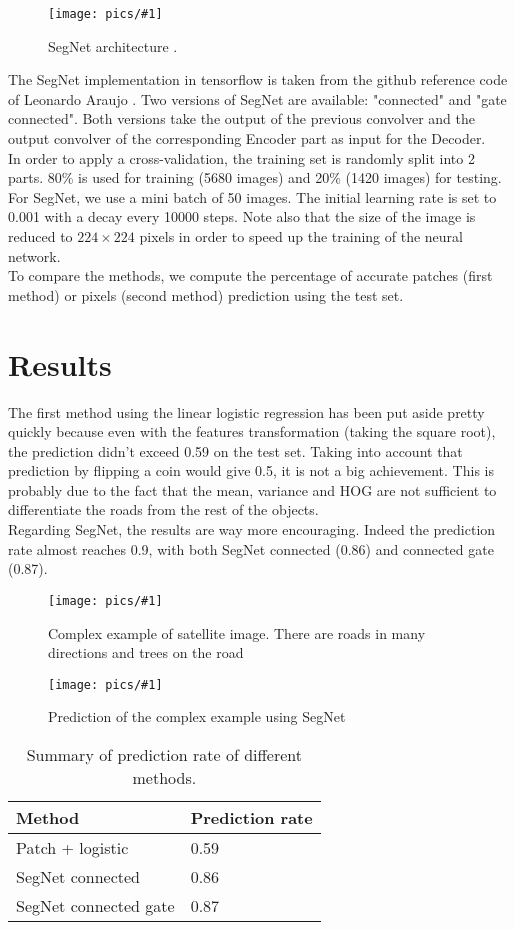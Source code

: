 \documentclass[10pt,conference,compsocconf]{IEEEtran}
\newcommand{\scalefig}[4]{
  \begin{figure}[ht!]
    \centering
    \texttt{[image: pics/\#1]}
 \caption{#3}
    \label{#4}
  \end{figure}}
\begin{document}
\scalefig{segnet}{1}{SegNet architecture \cite{segnet2}.}{fig:segnet_arch}

The SegNet implementation in tensorflow is taken from the github reference code of Leonardo Araujo \cite{leo}. Two versions of SegNet are available: "connected" and "gate connected". Both versions take the output of the previous convolver and the output convolver of the corresponding Encoder part as input for the Decoder. \\

In order to apply a cross-validation, the training set is randomly split into 2 parts. 80\%  is used for training (5680 images) and 20\% (1420 images) for testing. For SegNet, we use a mini batch of 50 images. The initial learning rate is set to 0.001 with a decay every 10000 steps. Note also that the size of the image is reduced to $224 \times 224$ pixels in order to speed up the training of the neural network.\\

To compare the methods, we compute the percentage of accurate patches (first method) or pixels (second method) prediction using the test set.

\section{Results}
The first method  using the linear logistic regression has been put aside pretty quickly because even with the features transformation (taking the square root), the prediction didn't exceed 0.59 on the test set. Taking into account that prediction by flipping a coin would give 0.5, it is not a big achievement. This is probably due to the fact that the mean, variance and HOG are not sufficient to differentiate the roads from the rest of the objects. \\
Regarding SegNet, the results are way more encouraging. Indeed the prediction rate almost reaches 0.9, with both SegNet connected (0.86) and connected gate (0.87).
\scalefig{pred}{0.9}{Complex example of satellite image. There are roads in many directions and trees on the road}{fig:pred}
\scalefig{pred_label}{0.85}{Prediction of the complex example using SegNet}{fig:pred_label}

\begin{table} [htbp]
  \centering
  \begin{tabular}[c]{|l|l|}
    \hline
    Method & Prediction rate\\
    \hline
    Patch + logistic & 0.59\\
    SegNet connected & 0.86\\
    SegNet connected gate & 0.87\\
    \hline
  \end{tabular}
  \caption{Summary of prediction rate of different methods.}
  \label{tab:results}
\end{table}
\end{document}
